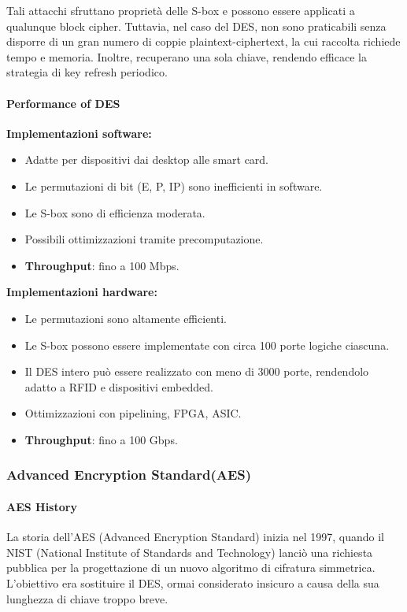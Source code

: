 \documentclass{report}
\begin{document}
Tali attacchi sfruttano proprietà delle S-box e possono essere applicati a qualunque block cipher. Tuttavia, nel caso del DES, non sono praticabili senza disporre di un gran numero di coppie plaintext-ciphertext, la cui raccolta richiede tempo e memoria. Inoltre, recuperano una sola chiave, rendendo efficace la strategia di key refresh periodico.

\paragraph{Performance of DES}

\textbf{Implementazioni software:}
\begin{itemize}
    \item Adatte per dispositivi dai desktop alle smart card.
    \item Le permutazioni di bit (E, P, IP) sono inefficienti in software.
    \item Le S-box sono di efficienza moderata.
    \item Possibili ottimizzazioni tramite precomputazione.
    \item \textbf{Throughput}: fino a 100 Mbps.
\end{itemize}

\textbf{Implementazioni hardware:}
\begin{itemize}
    \item Le permutazioni sono altamente efficienti.
    \item Le S-box possono essere implementate con circa 100 porte logiche ciascuna.
    \item Il DES intero può essere realizzato con meno di 3000 porte, rendendolo adatto a RFID e dispositivi embedded.
    \item Ottimizzazioni con pipelining, FPGA, ASIC.
    \item \textbf{Throughput}: fino a 100 Gbps.
\end{itemize}

\subsubsection{Advanced Encryption Standard(AES)}
\paragraph{AES History}

La storia dell'AES (Advanced Encryption Standard) inizia nel 1997, quando il NIST (National Institute of Standards and Technology) lanciò una richiesta pubblica per la progettazione di un nuovo algoritmo di cifratura simmetrica. L'obiettivo era sostituire il DES, ormai considerato insicuro a causa della sua lunghezza di chiave troppo breve.
\end{document}
